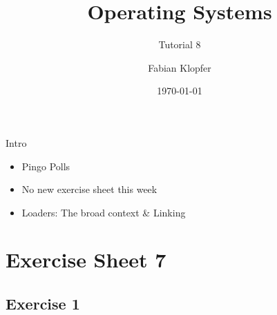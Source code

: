 \documentclass[10pt]{beamer}
\title{\textbf{Operating Systems}}
\subtitle{Tutorial 8}
\author{Fabian Klopfer}
\date{\today}
\begin{document}
\frame{\titlepage}


\begin{frame}{Intro}
\begin{itemize}
 \item Pingo Polls
 \item No new exercise sheet this week
 \item Loaders: The broad context \& Linking
\end{itemize}
\end{frame}

\section*{Exercise Sheet 7}
\frame{\sectionpage}
\subsection*{Exercise 1}
\frame{\subsectionpage}
\end{document}
